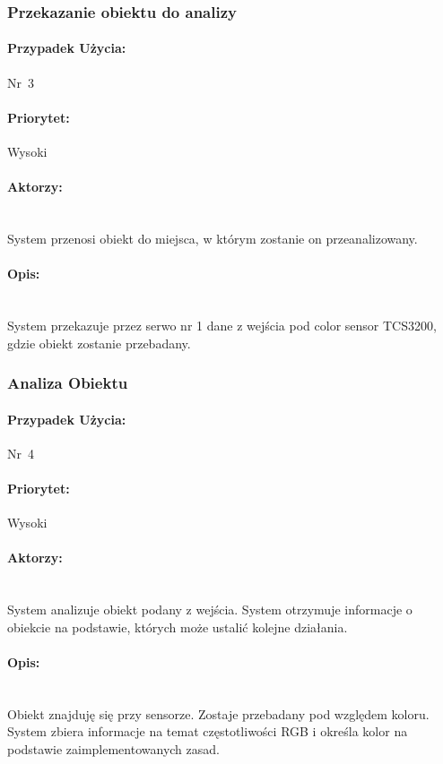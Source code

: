 \documentclass[12pt]{article}
\begin{document}
\subsubsection{Przekazanie obiektu do analizy}
\paragraph{Przypadek Użycia:}\mbox{Nr 3}
\paragraph{Priorytet:}\mbox{Wysoki}	
\paragraph{Aktorzy:}\mbox{} \\
System przenosi obiekt do miejsca, w którym zostanie on przeanalizowany.
\paragraph{Opis:}\mbox{} \\
System przekazuje przez serwo nr 1 dane z wejścia pod color sensor TCS3200, gdzie obiekt zostanie przebadany.

\subsubsection{Analiza Obiektu}
\paragraph{Przypadek Użycia:}\mbox{Nr 4}
\paragraph{Priorytet:}\mbox{Wysoki}	
\paragraph{Aktorzy:}\mbox{} \\
System analizuje obiekt podany z wejścia. System otrzymuje informacje o obiekcie na podstawie, których może ustalić kolejne działania.
\paragraph{Opis:}\mbox{} \\
Obiekt znajduję się przy sensorze. Zostaje przebadany pod względem koloru. System zbiera informacje na temat częstotliwości RGB i określa kolor na podstawie zaimplementowanych zasad.
\end{document}
